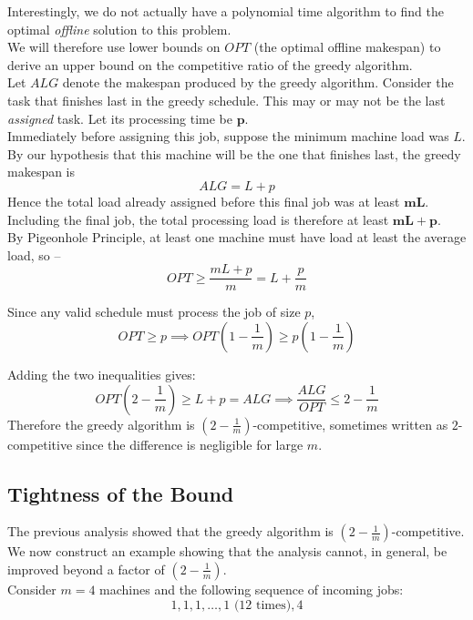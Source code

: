 \documentclass[11pt,openany]{book}
\begin{document}
Interestingly, we do not actually have a polynomial time algorithm to find the optimal \emph{offline} solution to this problem.\\


\noindent We will therefore use lower bounds on $OPT$ (the optimal offline makespan) to derive an upper 
bound on the competitive ratio of the greedy algorithm.\\

\noindent Let $ALG$ denote the makespan produced by the greedy algorithm. Consider the task that 
finishes last in the greedy schedule. This may or may not be the last \emph{assigned} task. Let its 
processing time be $\mathbf{p}$.\\

\noindent Immediately before assigning this job, suppose the minimum machine load was $L$.
By our hypothesis that this machine will be the one that finishes last, the greedy makespan is 
\[
ALG=L+p
\]
\vspace{0.5em}
Hence the total load already assigned before this final job was at least $\mathbf{mL}$.
Including the final job, the total processing load is therefore at least $\mathbf{mL+p}$.\\


\noindent By Pigeonhole Principle, at least one machine must have load at least the average load, so --
\[
OPT\ge \frac{mL+p}{m} = L+\frac{p}{m}
\]

Since any valid schedule must process the job of size $p$,
\[
OPT\ge p \implies OPT(1-\frac{1}{m})\ge p\left(1-\frac{1}{m}\right)
\]

Adding the two inequalities gives:
\[
OPT(2-\frac{1}{m})\ge L+p = ALG
\implies
\boxed{\frac{ALG}{OPT}\le 2-\frac1m}
\]
\vspace{0.5em}
Therefore the greedy algorithm is $\left(2-\frac1m\right)$-competitive, sometimes written as $2$-competitive 
since the difference is negligible for large $m$.

\subsection{Tightness of the Bound}

The previous analysis showed that the greedy algorithm is $\left(2-\frac1m\right)$-competitive.
 We now construct an example showing that the analysis cannot,
 in general, be improved beyond a factor of $\left(2-\frac1m\right)$. \\

Consider $m=4$ machines and the following sequence of incoming jobs:
\[
1,1,1,\dots,1 \text{ (12 times)},4
\]
\end{document}
